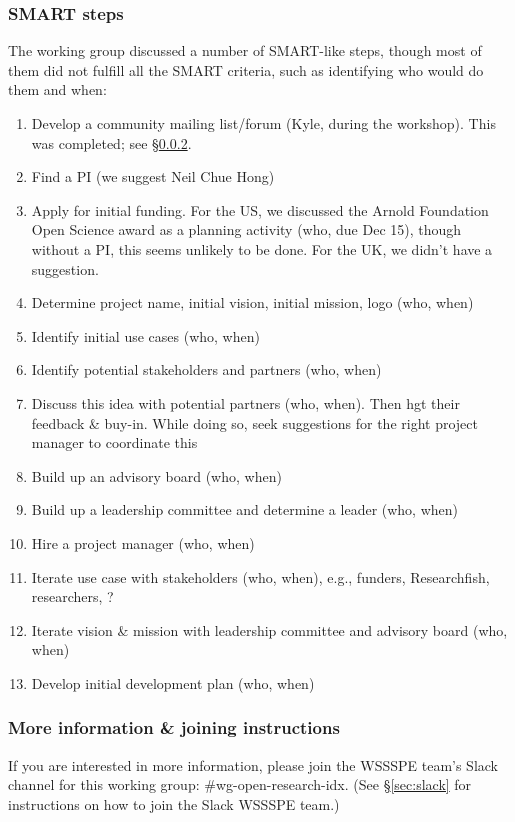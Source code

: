 \subsubsection{SMART steps}

The working group discussed a number of SMART-like steps, though most of them did not fulfill all the SMART criteria, such as identifying who would do them and when:

\begin{enumerate}
\item Develop a community mailing list/forum (Kyle, during the workshop).  This was completed; see \S\ref{sec:wg-open-research-index-list}.

\item Find a PI (we suggest Neil Chue Hong)

\item Apply for initial funding. For the US, we discussed the Arnold Foundation Open Science award as a planning activity (who, due Dec 15), though without a PI, this seems unlikely to be done.
For the UK, we didn't have a suggestion.

\item Determine project name, initial vision, initial mission, logo (who, when)

\item Identify initial use cases (who, when)

\item Identify potential stakeholders and partners (who, when)

\item Discuss this idea with potential partners (who, when).
Then hgt their feedback \& buy-in.
While doing so, seek suggestions for the right project manager to coordinate this

\item Build up an advisory board (who, when)

\item Build up a leadership committee and determine a leader (who, when)

\item Hire a project manager (who, when)

\item Iterate use case with stakeholders (who, when),
e.g., funders, Researchfish, researchers, ?

\item Iterate vision \& mission with leadership committee and advisory board (who, when)

\item Develop initial development plan (who, when)

\end{enumerate}


\subsubsection{More information \& joining instructions}\label{sec:wg-open-research-index-list}

If you are interested in more information, please join the WSSSPE team's Slack channel for this working group: \#wg-open-research-idx.  (See \S\ref{sec:slack} for instructions on how to join the Slack WSSSPE team.)
